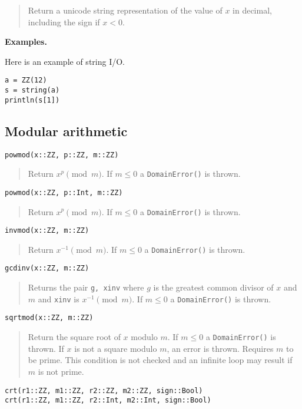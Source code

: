 \documentclass[a4paper,10pt]{article}
\newcommand{\code}{\lstinline}
\newcommand{\desc}[1]{\vspace{-3mm}\begin{quote}#1\end{quote}}
\begin{document}
{{{{{{\desc{Return a unicode string representation of the value of $x$ in decimal, including the sign
if $x < 0$.}

\textbf{Examples.}

Here is an example of string I/O.

\begin{lstlisting}
a = ZZ(12)
s = string(a)
println(s[1])
\end{lstlisting}

\subsection{Modular arithmetic}

\begin{lstlisting}
powmod(x::ZZ, p::ZZ, m::ZZ)
\end{lstlisting}

\desc{Return $x^p \pmod{m}$. If $m \leq 0$ a \code{DomainError()} is thrown.}

\begin{lstlisting}
powmod(x::ZZ, p::Int, m::ZZ)
\end{lstlisting}

\desc{Return $x^p \pmod{m}$. If $m \leq 0$ a \code{DomainError()} is thrown.}

\begin{lstlisting}
invmod(x::ZZ, m::ZZ)
\end{lstlisting}

\desc{Return $x^{-1} \pmod{m}$. If $m \leq 0$ a \code{DomainError()} is thrown.}

\begin{lstlisting}
gcdinv(x::ZZ, m::ZZ)
\end{lstlisting}

\desc{Returns the pair \code{g, xinv} where $g$ is the greatest common divisor of
$x$ and $m$ and \code{xinv} is $x^{-1} \pmod{m}$. If $m \leq 0$ a 
\code{DomainError()} is thrown.}

\begin{lstlisting}
sqrtmod(x::ZZ, m::ZZ)
\end{lstlisting}

\desc{Return the square root of $x$ modulo $m$. If $m \leq 0$ a \code{DomainError()}
is thrown. If $x$ is not a square modulo $m$, an error is thrown. Requires $m$ to
be prime. This condition is not checked and an infinite loop may result if $m$ is
not prime.}

\begin{lstlisting}
crt(r1::ZZ, m1::ZZ, r2::ZZ, m2::ZZ, sign::Bool)
crt(r1::ZZ, m1::ZZ, r2::Int, m2::Int, sign::Bool)
\end{lstlisting}

}}}}}}
\end{document}
